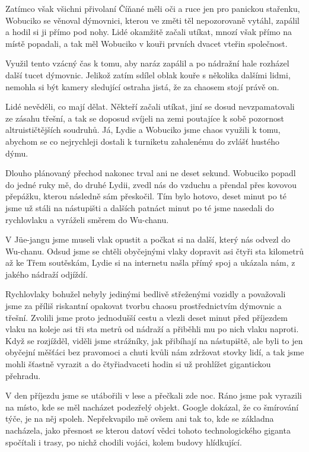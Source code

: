 Zatímco však všichni přivolaní Číňané měli oči a ruce jen pro panickou stařenku, Wobuciko se věnoval dýmovnici, kterou ve změti těl nepozorovaně vytáhl, zapálil a hodil si ji přímo pod nohy. Lidé okamžitě začali utíkat, mnozí však přímo na místě popadali, a tak měl Wobuciko v kouři prvních dvacet vteřin společnost. 

Využil tento vzácný čas k tomu, aby naráz zapálil a po nádražní hale rozházel další tucet dýmovnic. Jelikož zatím sdílel oblak kouře s několika dalšími lidmi, nemohla si být kamery sledující ostraha jistá, že za chaosem stojí právě on.

Lidé nevěděli, co mají dělat. Někteří začali utíkat, jiní se dosud nevzpamatovali ze zásahu třešní, a tak se doposud svíjeli na zemi poutajíce k sobě pozornost altruističtějších soudruhů. Já, Lydie a Wobuciko jsme chaos využili k tomu, abychom se co nejrychleji dostali k turniketu zahalenému do zvlášť hustého dýmu.

Dlouho plánovaný přechod nakonec trval ani ne deset sekund. Wobuciko popadl do jedné ruky mě, do druhé Lydii, zvedl nás do vzduchu a přendal přes kovovou přepážku, kterou následně sám přeskočil. Tím bylo hotovo, deset minut po té jsme už stáli na nástupišti a dalších patnáct minut po té jsme nasedali do rychlovlaku a vyráželi směrem do Wu-chanu.

V Jüe-jangu jsme museli vlak opustit a počkat si na další, který nás odvezl do Wu-chanu. Odsud jsme se chtěli obyčejnými vlaky dopravit asi čtyři sta kilometrů až ke Třem soutěskám, Lydie si na internetu našla přímý spoj a ukázala nám, z jakého nádraží odjíždí.

Rychlovlaky bohužel nebyly jedinými bedlivě střeženými vozidly a považovali jsme za příliš riskantní opakovat tvorbu chaosu prostřednictvím dýmovnic a třešní. Zvolili jsme proto jednodušší cestu a vlezli deset minut před příjezdem vlaku na koleje asi tři sta metrů od nádraží a přiběhli mu po nich vlaku naproti. Když se rozjížděl, viděli jsme strážníky, jak přibíhají na nástupiště, ale byli to jen obyčejní měšťáci bez pravomoci a chuti kvůli nám zdržovat stovky lidí, a tak jsme mohli šťastně vyrazit a do čtyřiadvaceti hodin si už prohlížet gigantickou přehradu.

V den příjezdu jsme se utábořili v lese a přečkali zde noc. Ráno jsme pak vyrazili na místo, kde se měl nacházet podezřelý objekt. Google dokázal, že co šmírování týče, je na něj spoleh. Nepřekvapilo mě ovšem ani tak to, kde se základna nacházela, jako přesnost se kterou datoví vědci tohoto technologického giganta spočítali i trasy, po nichž chodili vojáci, kolem budovy hlídkující.

